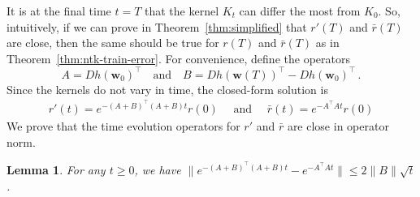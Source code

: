 \documentclass[11pt]{article} %
\newcommand{\<}{\langle}
\renewcommand{\>}{\rangle}
\def\bw{{\boldsymbol w}}
\theoremstyle{plain}
\newtheorem{lemma}[theorem]{Lemma}
\theoremstyle{definition}
\theoremstyle{remark}
\begin{document}
It is at the final time $t = T$ that the kernel $K_t$ can differ the most from $K_0$. So, intuitively, if we can prove in Theorem~\ref{thm:simplified} that $r'(T)$ and $\bar{r}(T)$ are close, then the same should be true for $r(T)$ and $\bar{r}(T)$ as in Theorem~\ref{thm:ntk-train-error}.  For convenience, define the operators $$A = Dh(\bw_0)^{\top} \quad \mbox{and} \quad B = Dh(\bw(T))^{\top} - Dh(\bw_0)^{\top}\,.$$ 
Since the kernels do not vary in time, the closed-form solution is
\begin{align*}
r'(t) = e^{-(A+B)^{\top}(A+B) t} r(0) \quad \mbox{ and } \quad \bar{r}(t) = e^{-A^{\top} A t} r(0)
\end{align*}
We prove that the time evolution operators for $r'$ and $\bar{r}$ are close in operator norm.
\begin{lemma}\label{lem:intuition}
For any $t \geq 0$, we have $\|e^{-(A+B)^{\top}(A+B) t} - e^{-A^{\top}A t}\| \leq 2 \|B\| \sqrt{t}$.
\end{lemma}
\end{document}
